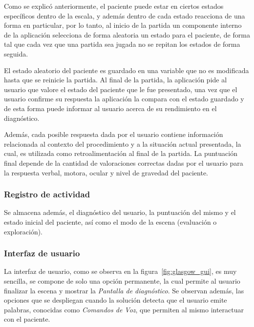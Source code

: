 Como se explicó anteriormente, el paciente puede estar en ciertos estados
específicos dentro de la escala, y además dentro de cada estado reacciona de una
forma en particular, por lo tanto, al inicio de la partida un componente interno
de la aplicación selecciona de forma aleatoria un estado para el paciente, de
forma tal que cada vez que una partida sea jugada no se repitan los estados de
forma seguida.

El estado aleatorio del paciente es guardado en una variable que no es
modificada hasta que se reinicie la partida. Al final de la partida, la
aplicación pide al usuario que valore el estado del paciente que le fue
presentado, una vez que el usuario confirme su respuesta la aplicación la
compara con el estado guardado y de esta forma puede informar al usuario acerca
de su rendimiento en el diagnóstico.

Además, cada posible respuesta dada por el usuario contiene información
relacionada al contexto del procedimiento y a la situación actual presentada, la
cual, es utilizada como retroalimentación al final de la partida. La puntuación
final depende de la cantidad de valoraciones correctas dadas por el usuario
para la respuesta verbal, motora, ocular y nivel de gravedad del paciente.

\subsubsection{Registro de actividad}


Se almacena además, el diagnóstico del usuario, la puntuación del mismo y el
estado inicial del paciente, así como el modo de la escena (evaluación o
exploración).

\subsubsection{Interfaz de usuario}

La interfaz de usuario, como se observa en la figura~\ref{fig:glasgow_gui}, es
muy sencilla, se compone de solo una opción permanente, la cual permite al
usuario finalizar la escena y mostrar la \emph{Pantalla de diagnóstico}. Se
observan además, las opciones que se despliegan cuando la solución detecta que el
usuario emite palabras, conocidas como \emph{Comandos de Voz}, que permiten al
mismo interactuar con el paciente.

